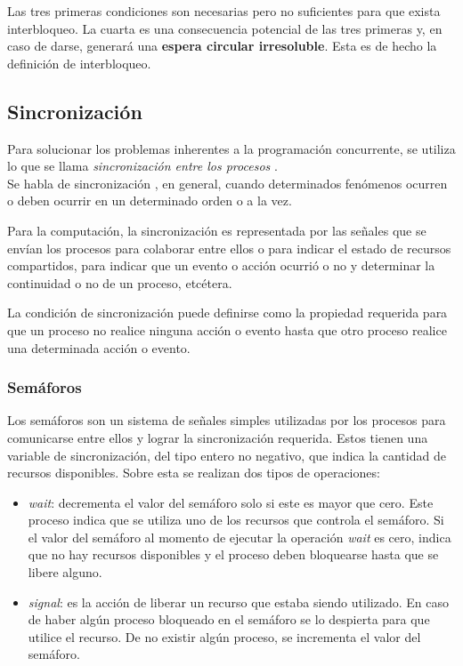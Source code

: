 Las tres primeras condiciones son necesarias pero no suficientes para que exista interbloqueo.
La cuarta es una consecuencia potencial de las tres primeras y, en caso de darse, generará una \textbf{espera circular irresoluble}. Esta es de hecho la definición de interbloqueo.

\subsection{Sincronización}
Para solucionar los problemas inherentes a la programación concurrente, se utiliza lo que se llama \textit{sincronización entre los procesos} . \\
Se habla de sincronización , en general, cuando determinados fenómenos ocurren o deben ocurrir en un determinado orden o a la vez.
\par Para la computación, la sincronización es representada por las señales que se envían los procesos para colaborar entre ellos o para indicar el estado de recursos compartidos, para indicar que un evento o acción ocurrió o no y determinar la continuidad o no de un proceso, etcétera.
\par La condición de sincronización puede definirse como la propiedad requerida para que un proceso no realice ninguna acción o evento hasta que otro proceso realice una determinada acción o evento.

\subsubsection{Semáforos}
Los semáforos son un sistema de señales simples utilizadas por los procesos para comunicarse entre ellos y lograr la sincronización requerida.
Estos tienen una variable de sincronización, del tipo entero no negativo, que indica la cantidad de recursos disponibles. Sobre esta se realizan dos tipos de operaciones:

\begin{itemize}
    \item \textit{wait}: decrementa el valor del semáforo solo si este es mayor que cero. Este proceso indica que se utiliza uno de los recursos que controla el semáforo. Si el valor del semáforo al momento de ejecutar la operación \textit{wait} es cero, indica que no hay recursos disponibles y el proceso deben bloquearse hasta que se libere alguno.
    \item \textit{signal}: es la acción de liberar un recurso que estaba siendo utilizado. En caso de haber algún proceso bloqueado en el semáforo se lo despierta para que utilice el recurso. De no existir algún proceso, se incrementa el valor del semáforo.
\end{itemize}

